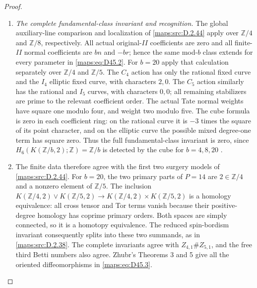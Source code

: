 \begin{proof}
\begin{enumerate}[label=\arabic*.,leftmargin=*]
\item \emph{The complete fundamental-class invariant and recognition.}
The global auxiliary-line comparison and localization
of \ref{maps:src:D.2.44} apply over $\mathbb Z/4$ and $\mathbb Z/8$,
respectively. All actual original-$II$ coefficients
are zero and all finite-$II$ normal coefficients
are $bn$ and $-br$; hence the same mod-$b$ class
extends for every parameter in \eqref{maps:eq:D45.2}.
For $b=20$ apply that calculation separately over
$\mathbb Z/4$ and $\mathbb Z/5$. The $C_4$ action
has only the rational fixed curve and the $I_4$
elliptic fixed curve, with characters $2,0$.
The $C_5$ action similarly has the rational and
$I_5$ curves, with characters $0,0$; all remaining
stabilizers are prime to the relevant coefficient
order. The actual Tate normal weights have square
one modulo four, and weight two modulo five.
The cube formula is zero in each coefficient ring:
on the rational curve it is $-3$ times the square
of its point character, and on the elliptic curve
the possible mixed degree-one term has square zero.
Thus the full fundamental-class invariant is zero,
since $H_6(K(\mathbb Z/b,2);\mathbb Z)=\mathbb Z/b$
is detected by the cube for $b=4,8,20$
\cite[Sections 3.11--3.14]{manZhubr75}.

\item The finite data therefore agree with the first two
surgery models of \ref{maps:src:D.2.44}. For $b=20$, the two
primary parts of $P=14$ are $2\in\mathbb Z/4$
and a nonzero element of $\mathbb Z/5$.
The inclusion
$K(\mathbb Z/4,2)\vee K(\mathbb Z/5,2)
\to K(\mathbb Z/4,2)\times K(\mathbb Z/5,2)$
is a homology equivalence: all cross tensor and
Tor terms vanish because their positive-degree
homology has coprime primary orders. Both spaces
are simply connected, so it is a homotopy equivalence.
The reduced spin-bordism invariant consequently
splits into these two summands, as in \ref{maps:src:D.2.38}.
The complete invariants agree with
$Z_{4,1}\#Z_{5,1}$, and the free third Betti numbers
also agree. Zhubr's Theorems 3 and 5
\cite{manZhubr75} give all the oriented
diffeomorphisms in \eqref{maps:eq:D45.3}.


\end{enumerate}
\end{proof}

